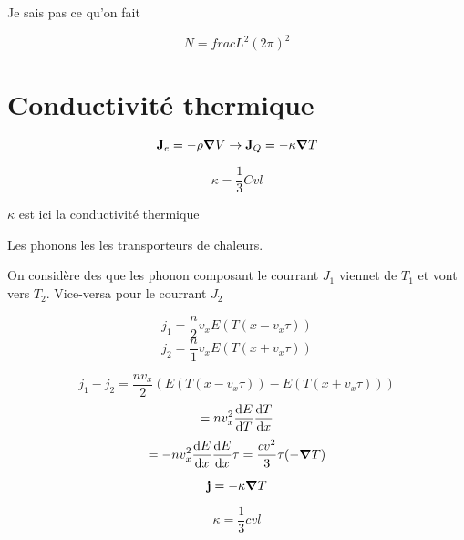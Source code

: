 


Je sais pas ce qu'on fait	

$$N = frac L^2 (2\pi)^2$$ 

\section*{Conductivité thermique}

$$\vb J_{e} = -\rho \grad V \to \vb J_{Q}= -\kappa\grad T$$ 

$$\kappa = \frac{1}{3} Cvl$$ 

$\kappa$ est ici la conductivité thermique

Les phonons les les transporteurs de chaleurs.


On considère des que les phonon composant le courrant $J_{1}$ viennet de $T_{1} $ et vont vers $T_{2}$. Vice-versa pour le courrant $J_2$

$$j_{1}= \frac{n}{2} v_{x}E(T(x-v_{x}\tau))$$ 
$$j_{2}= \frac{n}{1} v_{x} E (T(x + v_{x}\tau))$$

$$j_{1}-j_{2} = \frac{nv_{x}}{2} (E(T(x-v_{x}\tau)) -E(T(x+v_{x}\tau))) $$ 
$$=nv_{x}^2 \dv{E}{T} \dv{T}{x}(v_{x}\tau)$$ 
$$=-nv_{x}^2 \dv{E}{x} \dv{E}{x} \tau = \frac{cv^2}{3} \tau(-\grad T)$$ 

$$\vb j = -\kappa \grad T$$ 

$$\kappa = \frac{1}{3} cvl$$ 


